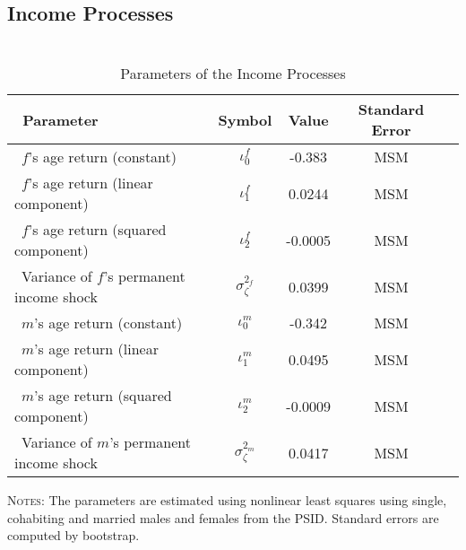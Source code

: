 \documentclass[12pt]{article}
\numberwithin{table}{section}
\begin{document}
\subsection{Income Processes}
\begin{table}[H]
\label{table:income_params}
\caption{\\Parameters of the Income Processes} %
\centering %
\begin{threeparttable}
\begin{tabular}{@{\extracolsep{5pt}}lcccc}   %
\hline \hline%
\ Parameter & Symbol  & Value &   Standard Error\\ [0.45ex] %
\hline
\ $f$'s age return (constant)         & $\iota^f_0$  & -0.383 & MSM & \\[0.45ex]
\ $f$'s age return (linear component) & $\iota^f_1$         & 0.0244  & MSM & \\[0.45ex]
\ $f$'s age return (squared component)               & $\iota^f_2$       & -0.0005 & MSM & \\[0.45ex]
\ Variance of $f$'s permanent income shock                                 & $\sigma_\zeta^{2_f}$             & 0.0399  & MSM & \\[0.45ex]
\ $m$'s age return (constant)         & $\iota^m_0$  & -0.342 & MSM & \\[0.45ex]
\ $m$'s age return (linear component) & $\iota^m_1$         & 0.0495  & MSM & \\[0.45ex]
\ $m$'s age return (squared component)               & $\iota^m_2$       & -0.0009 & MSM & \\[0.45ex]
\ Variance of $m$'s permanent income shock                                 & $\sigma_\zeta^{2_m}$             & 0.0417  & MSM & \\[0.45ex]
\hline
\end{tabular}
\begin{tablenotes}[flushleft]
\footnotesize{\item \textsc{Notes}: The parameters are estimated using nonlinear least squares using single, cohabiting and married males and females from the PSID. Standard errors are computed by bootstrap.}
\end{tablenotes}
\end{threeparttable}
\end{table}
\FloatBarrier
\end{document}

